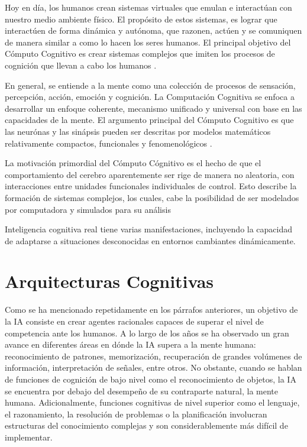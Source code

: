 Hoy en día, los humanos crean sistemas virtuales que emulan e interact\'{u}an con nuestro medio ambiente físico. El prop\'{o}sito de estos sistemas, es lograr que interact\'{u}en de forma din\'{a}mica y aut\'{o}noma, que razonen, act\'{u}en y se comuniquen de manera similar a como lo hacen los seres humanos. El principal objetivo del C\'{o}mputo Cognitivo es crear sistemas complejos que imiten los procesos de cognici\'{o}n que llevan a cabo los humanos \cite{crowder2014artificial}.

En general, se entiende a la mente como una colección de procesos de sensaci\'{o}n, percepci\'{o}n, acci\'{o}n, emoci\'{o}n y cognici\'{o}n. La Computaci\'{o}n Cognitiva se enfoca a desarrollar un enfoque coherente, mecanismo unificado y universal con base en las capacidades de la mente. El argumento principal del C\'{o}mputo Cognitivo es que las neur\'{o}nas y las sin\'{a}psis pueden ser descritas por modelos matem\'{a}ticos relativamente compactos, funcionales y fenomenol\'{o}gicos \cite{cc}.

La motivación primordial del C\'{o}mputo C\'{ognitivo} es el hecho de que el comportamiento
del cerebro aparentemente ser rige de manera no aleatoria, con interacciones entre unidades funcionales individuales de control. Esto describe la formaci\'{o}n de sistemas complejos, los cuales, cabe la posibilidad de ser modelados por computadora y simulados para su an\'{a}lisis \cite{cc}

Inteligencia cognitiva real tiene varias manifestaciones, incluyendo la capacidad de adaptarse a situaciones desconocidas en entornos cambiantes din\'{a}micamente.
\section{Arquitecturas Cognitivas}

Como se ha mencionado repetidamente en los p\'{a}rrafos anteriores, un objetivo de la IA consiste en crear agentes racionales capaces de superar el nivel de competencia ante los humanos. A lo largo de los a\~nos se ha observado un gran avance en diferentes \'{a}reas en d\'{o}nde la IA supera a la mente humana: reconocimiento de patrones, memorizaci\'{o}n, recuperaci\'{o}n de grandes vol\'{u}menes de informaci\'{o}n, interpretaci\'{o}n de se\~nales, entre otros. No obstante, cuando se hablan de funciones de cognici\'{o}n de bajo nivel como el reconocimiento de objetos, la IA se encuentra por debajo del desempe\~no de su contraparte natural, la mente humana. Adicionalmente, funciones cognitivas de nivel superior como el lenguaje, el razonamiento, la resoluci\'{o}n de problemas o la planificaci\'{o}n involucran estructuras del conocimiento complejas y son considerablemente m\'{a}s dif\'{i}cil de implementar. 

